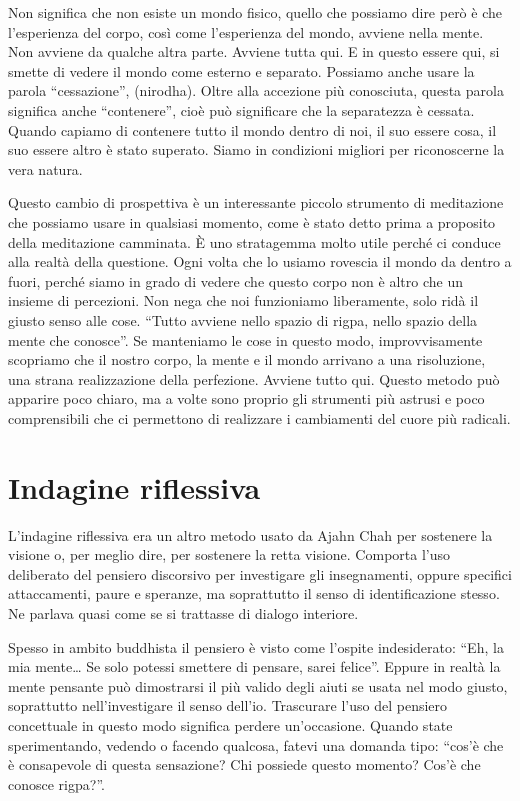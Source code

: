 Non significa che non esiste un mondo fisico, quello che possiamo dire però è che l'esperienza del corpo, così come l'esperienza del mondo, avviene nella mente. Non avviene da qualche altra parte. Avviene tutta qui. E in questo essere qui, si smette di vedere il mondo come esterno e separato. Possiamo anche usare la parola ``cessazione'', (nirodha). Oltre alla accezione più conosciuta, questa parola significa anche ``contenere'', cioè può significare che la separatezza è cessata. Quando capiamo di contenere tutto il mondo dentro di noi, il suo essere cosa, il suo essere altro è stato superato. Siamo in condizioni migliori per riconoscerne la vera natura.

Questo cambio di prospettiva è un interessante piccolo strumento di meditazione che possiamo usare in qualsiasi momento, come è stato detto prima a proposito della meditazione camminata. È uno stratagemma molto utile perché ci conduce alla realtà della questione. Ogni volta che lo usiamo rovescia il mondo da dentro a fuori, perché siamo in grado di vedere che questo corpo non è altro che un insieme di percezioni. Non nega che noi funzioniamo liberamente, solo ridà il giusto senso alle cose. ``Tutto avviene nello spazio di rigpa, nello spazio della mente che conosce''. Se manteniamo le cose in questo modo, improvvisamente scopriamo che il nostro corpo, la mente e il mondo arrivano a una risoluzione, una strana realizzazione della perfezione. Avviene tutto qui. Questo metodo può apparire poco chiaro, ma a volte sono proprio gli strumenti più astrusi e poco comprensibili che ci permettono di realizzare i cambiamenti del cuore più radicali.

\section*{Indagine riflessiva}

L'indagine riflessiva era un altro metodo usato da Ajahn Chah per sostenere la visione o, per meglio dire, per sostenere la retta visione. Comporta l'uso deliberato del pensiero discorsivo per investigare gli insegnamenti, oppure specifici attaccamenti, paure e speranze, ma soprattutto il senso di identificazione stesso. Ne parlava quasi come se si trattasse di dialogo interiore.

Spesso in ambito buddhista il pensiero è visto come l'ospite indesiderato: ``Eh, la mia mente\ldots{} Se solo potessi smettere di pensare, sarei felice''. Eppure in realtà la mente pensante può dimostrarsi il più valido degli aiuti se usata nel modo giusto, soprattutto nell'investigare il senso dell'io. Trascurare l'uso del pensiero concettuale in questo modo significa perdere un'occasione. Quando state sperimentando, vedendo o facendo qualcosa, fatevi una domanda tipo: ``cos'è che è consapevole di questa sensazione? Chi possiede questo momento? Cos'è che conosce rigpa?''. 

